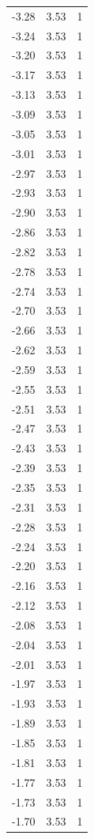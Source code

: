 \begin{longtable}{lrr}
  -3.28 & 3.53 & 1 \\
  -3.24 & 3.53 & 1 \\
  -3.20 & 3.53 & 1 \\
  -3.17 & 3.53 & 1 \\
  -3.13 & 3.53 & 1 \\
  -3.09 & 3.53 & 1 \\
  -3.05 & 3.53 & 1 \\
  -3.01 & 3.53 & 1 \\
  -2.97 & 3.53 & 1 \\
  -2.93 & 3.53 & 1 \\
  -2.90 & 3.53 & 1 \\
  -2.86 & 3.53 & 1 \\
  -2.82 & 3.53 & 1 \\
  -2.78 & 3.53 & 1 \\
  -2.74 & 3.53 & 1 \\
  -2.70 & 3.53 & 1 \\
  -2.66 & 3.53 & 1 \\
  -2.62 & 3.53 & 1 \\
  -2.59 & 3.53 & 1 \\
  -2.55 & 3.53 & 1 \\
  -2.51 & 3.53 & 1 \\
  -2.47 & 3.53 & 1 \\
  -2.43 & 3.53 & 1 \\
  -2.39 & 3.53 & 1 \\
  -2.35 & 3.53 & 1 \\
  -2.31 & 3.53 & 1 \\
  -2.28 & 3.53 & 1 \\
  -2.24 & 3.53 & 1 \\
  -2.20 & 3.53 & 1 \\
  -2.16 & 3.53 & 1 \\
  -2.12 & 3.53 & 1 \\
  -2.08 & 3.53 & 1 \\
  -2.04 & 3.53 & 1 \\
  -2.01 & 3.53 & 1 \\
  -1.97 & 3.53 & 1 \\
  -1.93 & 3.53 & 1 \\
  -1.89 & 3.53 & 1 \\
  -1.85 & 3.53 & 1 \\
  -1.81 & 3.53 & 1 \\
  -1.77 & 3.53 & 1 \\
  -1.73 & 3.53 & 1 \\
  -1.70 & 3.53 & 1 \\

\end{longtable}
